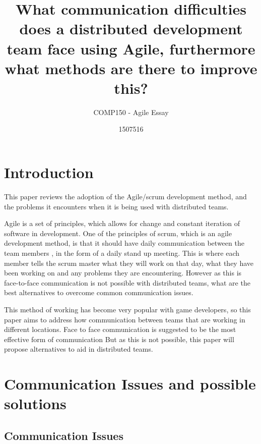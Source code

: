 \documentclass{scrartcl}
\title{What communication difficulties does a distributed development team face using Agile, furthermore what methods are there to improve this?}
\subtitle{COMP150 - Agile Essay}
\author{1507516}
\begin{document}
\maketitle


\section{Introduction}

This paper reviews the adoption of the Agile/scrum development method, and the problems it encounters when it is being used with distributed teams.

Agile is a set of principles, which allows for change and constant iteration of software in development. One of the principles of scrum, which is an agile development method, is that it should have daily communication between the team members \cite{abdullah2011}, in the form of a daily stand up meeting. This is where each member tells the scrum master what they will work on that day, what they have been working on and any problems they are encountering. However as this is face-to-face communication is not possible with distributed teams, what are the best alternatives to overcome common communication issues.

This method of working has become very popular with game developers, so this paper aims to address how communication between teams that are working in different locations. 
Face to face communication is suggested to be the most effective form of communication But as this is not possible, this paper will propose alternatives to aid in distributed teams.

\section{Communication Issues and possible solutions}

\subsection{Communication Issues}
\end{document}
